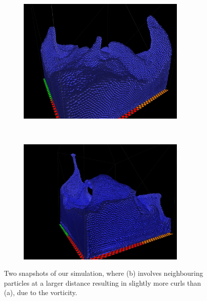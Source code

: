 \begin{figure}[H]
\centering
\begin{subfigure}{.8\textwidth}
  \centering
  \includegraphics[width=0.9\textwidth]{img/55296_edit.png}
  \caption{}
\end{subfigure}%
\\
\begin{subfigure}{.8\textwidth}
  \centering
  \includegraphics[width=0.9\textwidth]{img/3Nieghbours_55size.png}
  \caption{}
\end{subfigure}%

\caption{Two snapshots of our simulation, where (b) involves neighbouring particles at a larger distance resulting in slightly more curls than (a), due to the vorticity.}
\label{fig:result}
\end{figure}
